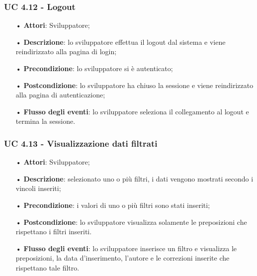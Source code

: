 
\subsubsection{UC 4.12 - Logout}
\begin{itemize}
	\item[•]\textbf{Attori}: Sviluppatore;
	\item[•]\textbf{Descrizione}: lo sviluppatore effettua il logout dal sistema e viene reindirizzato alla pagina di login;
	\item[•]\textbf{Precondizione}: lo sviluppatore si è autenticato;
	\item[•]\textbf{Postcondizione}: lo sviluppatore ha chiuso la sessione e viene reindirizzato alla pagina di autenticazione; 
	\item[•]\textbf{Flusso degli eventi}: lo sviluppatore seleziona il collegamento al logout e termina la sessione.
\end{itemize}


\subsubsection{UC 4.13 - Visualizzazione dati filtrati}
\begin{itemize}
	\item[•]\textbf{Attori}: Sviluppatore;
	\item[•]\textbf{Descrizione}: selezionato uno o più filtri, i dati vengono mostrati secondo i vincoli inseriti;
	\item[•]\textbf{Precondizione}: i valori di uno o più filtri sono stati inseriti;
	\item[•]\textbf{Postcondizione}: lo sviluppatore visualizza solamente le preposizioni che rispettano i filtri inseriti.
	\item[•]\textbf{Flusso degli eventi}: lo sviluppatore inserisce un filtro e visualizza le preposizioni, la data d'inserimento, l'autore e le correzioni inserite che rispettano tale filtro.
\end{itemize}

